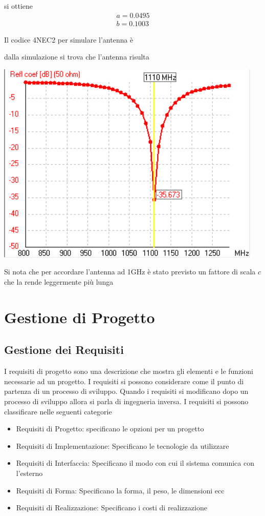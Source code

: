 \documentclass[10pt,a4paper]{book}
\begin{document}
si ottiene 
\begin{eqnarray}
a= 0.0495 \\
b= 0.1003
\end{eqnarray}

Il codice 4NEC2 per simulare l'antenna è 


dalla simulazione si trova che l'antenna risulta 
\begin{center}
\includegraphics[scale=1]{img/Antenne/rectangular_loop_return_loss.png} 
\end{center}

Si nota che per accordare l'antenna ad 1GHz è stato previsto un fattore di scala $c$ che la rende leggermente più lunga


\chapter{Gestione di Progetto}
\section{Gestione dei Requisiti}
I requisiti di progetto sono una descrizione che mostra gli elementi e le funzioni necessarie ad un progetto. I requisiti si possono considerare come il punto di partenza di un processo di sviluppo. Quando i requisiti si modificano dopo un processo di sviluppo allora si parla di ingegneria inversa.
I requisiti si possono classificare nelle seguenti categorie
\begin{itemize}
\item Requisiti di Progetto: specificano le opzioni per un progetto
\item Requisiti di Implementazione: Specificano le tecnologie da utilizzare
\item Requisiti di Interfaccia: Specificano il modo con cui il sistema comunica con l'esterno
\item Requisiti di Forma: Specificano la forma, il peso, le dimensioni ecc
\item Requisiti di Realizzazione: Specificano i costi di realizzazione
\end{itemize}
\end{document}
